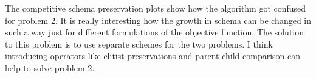 \documentclass{article}
\begin{document}
The competitive schema preservation plots show how the algorithm got confused for problem 2. It is really interesting how the growth in schema can be changed in such a way just for different formulations of the objective function. The solution to this problem is to use separate schemes for the two problems. I think introducing operators like elitist preservations and parent-child comparison can help to solve problem 2.\\ 
\end{document}

